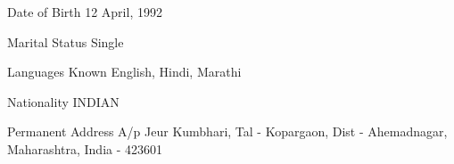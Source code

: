 

\begin{cvskills}

  \cvskill
    {Date of Birth} %
    {12 April, 1992} %

  \cvskill
    {Marital Status} %
    {Single} %
    
  \cvskill
    {Languages Known} %
    {English, Hindi, Marathi} %

  \cvskill
    {Nationality} %
    {INDIAN} %
    
  \cvskill
    {Permanent Address} %
    {A/p Jeur Kumbhari, Tal - Kopargaon, Dist - Ahemadnagar, Maharashtra, India - 423601} %
\end{cvskills}
